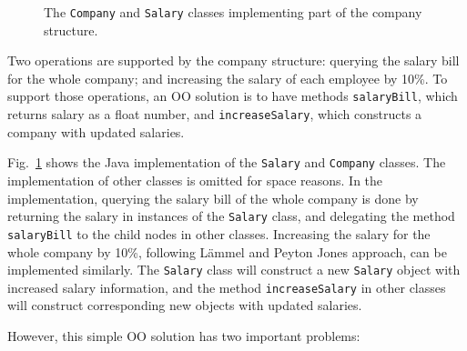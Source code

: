 \begin{figure}[t]
\vspace{-.1in}
\caption{The \lstinline{Company} and \lstinline{Salary} classes
  implementing part of the company structure.}
\label{oop_company}
\end{figure}

Two operations are supported by the company structure: querying the
salary bill for the whole company; and increasing the salary of each
employee by 10\%. To support those operations, an OO solution is to
have methods \lstinline{salaryBill}, which returns salary as a float
number, and \lstinline{increaseSalary}, which constructs a company
with updated salaries.

Fig.~\ref{oop_company} shows the Java implementation of the
\lstinline{Salary} and \lstinline{Company} classes. The implementation
of other classes is omitted for space reasons.  In the
implementation, querying the salary bill of the whole company is done
by returning the salary in instances of the \lstinline{Salary} class,
and delegating the method \lstinline{salaryBill} to the child nodes in
other classes. Increasing the salary for the whole company by 10\%,
following L\"ammel and Peyton Jones approach, can be implemented
similarly. The \lstinline{Salary} class will construct a new
\lstinline{Salary} object with increased salary information, and
the method \lstinline{increaseSalary} in other classes will
construct corresponding new objects with updated salaries.

However, this simple OO solution has two important problems:

